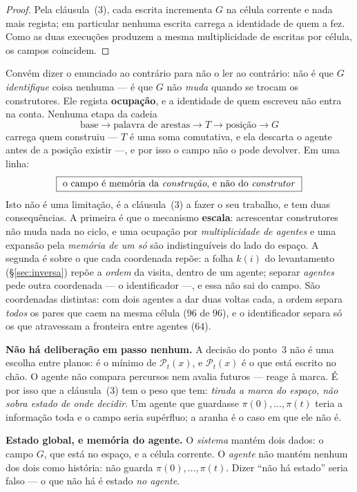 \documentclass[11pt,a4paper]{article}
\begin{document}
\begin{proof}
Pela cláusula~(3), cada escrita incrementa $G$ na célula corrente e nada mais
regista; em particular nenhuma escrita carrega a identidade de quem a fez. Como
as duas execuções produzem a mesma multiplicidade de escritas por célula, os
campos coincidem.
\end{proof}

\medskip\noindent Convém dizer o enunciado ao contrário para não o ler ao
contrário: não é que $G$ \emph{identifique} coisa nenhuma --- é que $G$ não
\emph{muda} quando se trocam os construtores. Ele regista \textbf{ocupação}, e a
identidade de quem escreveu não entra na conta. Nenhuma etapa da cadeia
\[
\text{base}\longrightarrow\text{palavra de arestas}\longrightarrow T
\longrightarrow\text{posição}\longrightarrow G
\]
carrega quem construiu --- $T$ é uma soma comutativa, e ela descarta o agente
antes de a posição existir ---, e por isso o campo não o pode devolver. Em uma
linha:
\[
\boxed{\ \text{o campo é memória da \emph{construção}, e não do \emph{construtor}}\ }
\]
Isto não é uma limitação, é a cláusula~(3) a fazer o seu trabalho, e tem duas
consequências. A primeira é que o mecanismo \textbf{escala}:
acrescentar construtores não muda nada no ciclo, e uma ocupação por
\emph{multiplicidade de agentes} e uma expansão pela \emph{memória de um só} são
indistinguíveis do lado do espaço. A segunda é sobre o que cada coordenada repõe:
a folha $k(i)$ do levantamento (§\ref{sec:inversa}) repõe a \emph{ordem} da
visita, dentro de um agente; separar \emph{agentes} pede outra coordenada --- o
identificador ---, e essa não sai do campo. São coordenadas distintas: com dois
agentes a dar duas voltas cada, a ordem separa \emph{todos} os pares que caem na
mesma célula ($96$ de $96$), e o identificador separa só os que atravessam a
fronteira entre agentes ($64$).

\medskip\noindent\textbf{Não há deliberação em passo nenhum.} A decisão do
ponto~3 não é uma escolha entre planos: é o mínimo de $\mathcal{P}_t(x)$, e
$\mathcal{P}_t(x)$ é o que está escrito no chão. O agente não compara percursos
nem avalia futuros --- reage à marca. É por isso que a cláusula~(3) tem o peso
que tem: \emph{tirada a marca do espaço, não sobra estado de onde decidir}. Um
agente que guardasse $\pi(0),\dots,\pi(t)$ teria a informação toda e o campo
seria supérfluo; a aranha é o caso em que ele não é.

\medskip\noindent\textbf{Estado global, e memória do agente.} O \emph{sistema}
mantém dois dados: o campo $G$, que está no espaço, e a célula corrente. O
\emph{agente} não mantém nenhum dos dois como história: não guarda
$\pi(0),\dots,\pi(t)$. Dizer ``não há estado'' seria falso --- o que não há é
estado \emph{no agente}.
\end{document}
